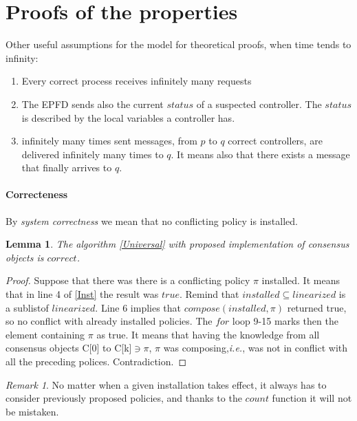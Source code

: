 \documentclass{article}
\newtheorem{lemma}{Lemma}
\theoremstyle{remark}
\newtheorem*{remark}{Remark}
\begin{document}
\section{Proofs of the properties}
Other useful assumptions for the model for theoretical proofs, when time tends to infinity:
\begin{enumerate}
\item Every correct process receives infinitely many requests
\item The EPFD sends also the current $status$ of a suspected controller. The $status$ is described by the local variables a controller has.
\item infinitely many times sent messages, from $p$ to $q$ correct controllers, are delivered infinitely many times to $q$. It means also that there exists a message that finally arrives to $q$.
\end{enumerate}

\paragraph{Correcteness} 
By \emph{system correctness} we mean that no conflicting policy is installed.
\begin{lemma}\label{Correctness}
The algorithm \ref{Universal} with proposed implementation of consensus objects is $correct$. 
\end{lemma}
\begin{proof}
Suppose that there was there is a conflicting policy $\pi$ installed. It means that in line 4 of \ref{Inst} the result was $true$. Remind that $installed\subseteq linearized$ is a sublist\footnotemark of $linearized$. 
 Line 6 implies that $compose(installed,\pi)$ returned true, so no conflict with already installed policies. The $for$ loop 9-15 marks then the element containing $\pi$ as true. It means that having the knowledge from all consensus objects C[0] to C[k]$\ni\pi$, $\pi$ was composing,\emph{i.e.}, was not in conflict with all the preceding polices. Contradiction.
\end{proof}
\begin{remark}
No matter when a given installation takes effect, it always has to consider previously proposed policies, and thanks to the $count$ function it will not be mistaken.
\end{remark}
\end{document}
